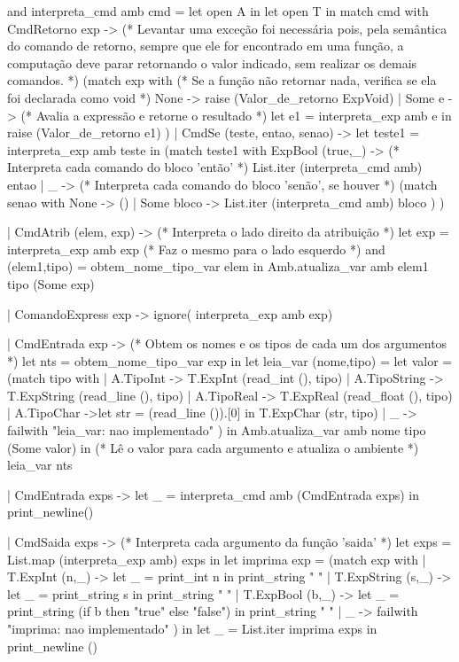 \documentclass[12pt,a4paper,twoside]{article}
\begin{document}
\begin{terminal}
and interpreta_cmd amb cmd =
  let open A in
  let open T in
  match cmd with
    CmdRetorno exp ->
    (* Levantar uma exceção foi necessária pois, pela semântica do comando de
        retorno, sempre que ele for encontrado em uma função, a computação
        deve parar retornando o valor indicado, sem realizar os demais comandos.
    *)
    (match exp with
     (* Se a função não retornar nada, verifica se ela foi declarada como void *)
       None -> raise (Valor_de_retorno ExpVoid)
     | Some e ->
       (* Avalia a expressão e retorne o resultado *)
       let e1 = interpreta_exp amb e in
       raise (Valor_de_retorno e1)
    )
  | CmdSe (teste, entao, senao) ->
    let teste1 = interpreta_exp amb teste in
   (match teste1 with
       ExpBool (true,_) ->
       (* Interpreta cada comando do bloco 'então' *)
       List.iter (interpreta_cmd amb) entao
     | _ ->
       (* Interpreta cada comando do bloco 'senão', se houver *)
       (match senao with
          None -> ()
        | Some bloco -> List.iter (interpreta_cmd amb) bloco
       )
    )

  | CmdAtrib (elem, exp) ->
    (* Interpreta o lado direito da atribuição *)
    let exp = interpreta_exp amb exp
    (* Faz o mesmo para o lado esquerdo *)
    and (elem1,tipo) = obtem_nome_tipo_var elem in
    Amb.atualiza_var amb elem1 tipo (Some exp)

  | ComandoExpress exp -> ignore( interpreta_exp amb exp)

  | CmdEntrada exp ->
    (* Obtem os nomes e os tipos de cada um dos argumentos *)
    let nts = obtem_nome_tipo_var exp in
    let leia_var (nome,tipo) =
      let valor =
        (match tipo with
         | A.TipoInt    -> T.ExpInt    (read_int (),   tipo)
         | A.TipoString -> T.ExpString (read_line (),  tipo)
         | A.TipoReal  -> T.ExpReal  (read_float (), tipo)
         | A.TipoChar   ->let str = (read_line ()).[0] in T.ExpChar   (str,  tipo)
         | _ -> failwith "leia_var: nao implementado"
        )
      in  Amb.atualiza_var amb nome tipo (Some valor)
    in
    (* Lê o valor para cada argumento e atualiza o ambiente *)
    leia_var nts

  | CmdEntrada exps ->
    let _ = interpreta_cmd amb (CmdEntrada exps) in
      print_newline()

  | CmdSaida exps ->
    (* Interpreta cada argumento da função 'saida' *)
    let exps = List.map (interpreta_exp amb) exps in
    let imprima exp =
      (match exp with
       | T.ExpInt (n,_) ->      let _ = print_int n in print_string " "
       | T.ExpString (s,_) -> let _ = print_string s in print_string " "
       | T.ExpBool (b,_) ->
         let _ = print_string (if b then "true" else "false")
         in print_string " "
       | _ -> failwith "imprima: nao implementado"
      )
    in
    let _ = List.iter imprima exps in
    print_newline ()


\end{terminal}
\end{document}
